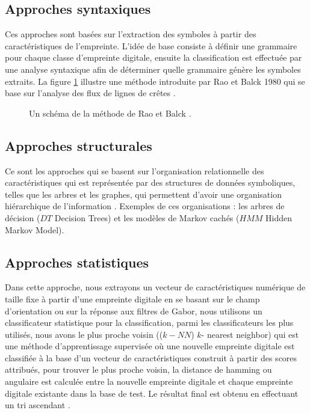 \subsection{Approches syntaxiques}
Ces approches sont basées sur l'extraction des symboles à partir des caractéristiques de l'empreinte. L'idée de base consiste à définir une grammaire pour chaque classe d'empreinte digitale, ensuite la classification est effectuée par une analyse syntaxique afin de déterminer quelle grammaire génère les symboles extraits\citep{mridula2014review}. La figure \ref{fig:chapitre2classificationsyntax} illustre une méthode introduite par Rao et Balck 1980 qui se base sur l'analyse des flux de lignes de crêtes \citep{karu1996fingerprint}.


\begin{center}
	\begin{figure}[H]
		\centering
		\caption{Un schéma de la méthode de Rao et Balck \citep{karu1996fingerprint}.}
		\label{fig:chapitre2classificationsyntax}
	\end{figure}
\end{center}
\subsection{Approches structurales}
Ce sont les approches qui se basent sur l'organisation relationnelle des caractéristiques qui est représentée par des structures de données symboliques, telles que les arbres et les graphes, qui permettent d'avoir une organisation hiérarchique de l'information \citep{maio1996structural}. Exemples de ces organisations : les arbres de décision ($ DT $ Decision Trees) et les modèles de Markov cachés ($ HMM $ Hidden Markov Model).
\subsection{Approches statistiques}
\label{KNN}
Dans cette approche, nous extrayons un vecteur de caractéristiques numérique de taille fixe à partir d'une empreinte digitale en se basant sur le champ d'orientation ou sur la réponse aux filtres de Gabor, nous utilisons un classificateur statistique pour la classification, parmi les classificateurs les plus utilisés, nous avons le plus proche voisin (($ k-NN $) $ k $- nearest neighbor) qui est une méthode d'apprentissage supervisée où une nouvelle empreinte digitale est classifiée à la base d'un vecteur de caractéristiques construit à partir des scores attribués, pour trouver le plus proche voisin, la distance de hamming ou angulaire est calculée entre la nouvelle empreinte digitale et chaque empreinte digitale existante dans la base de test. Le résultat final est obtenu en effectuant un tri ascendant \citep{kong2009survey}.
